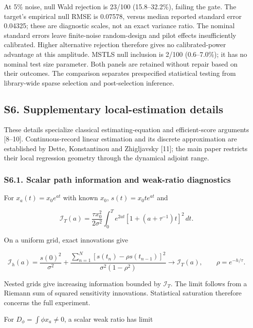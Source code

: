 \documentclass[
  american,
  11pt,
]{article}
\begin{document}
At 5\% noise, null Wald rejection is 23/100 (15.8--32.2\%), failing the
gate. The target's empirical null RMSE is 0.07578, versus median
reported standard error 0.04325; these are diagnostic scales, not an
exact variance ratio. The nominal standard errors leave finite-noise
random-design and pilot effects insufficiently calibrated. Higher
alternative rejection therefore gives no calibrated-power advantage at
this amplitude. MSTLS null inclusion is 2/100 (0.6--7.0\%); it has no
nominal test size parameter. Both panels are retained without repair
based on their outcomes. The comparison separates prespecified
statistical testing from library-wide sparse selection and
post-selection inference.

\subsection{S6. Supplementary local-estimation
details}\label{s6.-supplementary-local-estimation-details}

These details specialize classical estimating-equation and
efficient-score arguments {[}8--10{]}. Continuous-record linear
estimation and its discrete approximation are established by Dette,
Konstantinou and Zhigljavsky {[}11{]}; the main paper restricts their
local regression geometry through the dynamical adjoint range.

\subsubsection{S6.1. Scalar path information and weak-ratio
diagnostics}\label{s6.1.-scalar-path-information-and-weak-ratio-diagnostics}

For \(x_a(t)=x_0e^{at}\) with known \(x_0\), \(s(t)=x_0te^{at}\) and

\[
\mathcal I_T(a)=\frac{\tau x_0^2}{2\sigma^2}
\int_0^Te^{2at}[1+(a+\tau^{-1})t]^2\,dt.
\]

On a uniform grid, exact innovations give

\[
\mathcal I_h(a)=\frac{s(0)^2}{\sigma^2}+
\frac{\sum_{n=1}^N[s(t_n)-\rho s(t_{n-1})]^2}{\sigma^2(1-\rho^2)}
\longrightarrow\mathcal I_T(a),\qquad\rho=e^{-h/\tau}.
\]

Nested grids give increasing information bounded by \(\mathcal I_T\).
The limit follows from a Riemann sum of squared sensitivity innovations.
Statistical saturation therefore concerns the full experiment.

For \(D_\phi=\int\phi x_a\ne0\), a scalar weak ratio has limit
\end{document}
